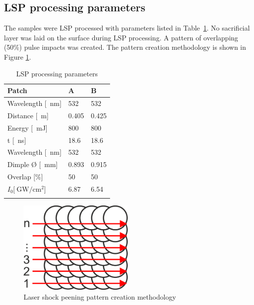 \documentclass[sn-nature]{sn-jnl}%
\theoremstyle{thmstyleone}%
\theoremstyle{thmstyletwo}%
\theoremstyle{thmstylethree}%
\begin{document}

    \subsection{LSP processing parameters}

   The samples were LSP processed with parameters listed in Table~\ref{tab:lspparameters}. No sacrificial layer was laid on the surface during LSP processing. A  pattern of overlapping (50\%) pulse impacts was created. The pattern creation methodology is shown in Figure \ref{fig:pattern_creation}.

    \begin{table}[h!]
    \caption{LSP processing parameters}\label{tab:lspparameters}%
    \begin{tabular}{@{}lll@{}}
    \toprule
    Patch & A & B  \\
    \midrule
    Wavelength [\SI{}{\nm}] & 532 & 532    \\
    Distance [\SI{}{\m}] & 0.405 & 0.425    \\
    Energy [\SI{}{\milli\joule}]& 800 & 800    \\
    t [\SI{}{\ns}] & 18.6 & 18.6    \\
    Wavelength [\SI{}{\nm}] & 532 & 532    \\
    Dimple Ø [\SI{}{ \mm}] & 0.893 & 0.915    \\
    Overlap [\%]  & 50 & 50    \\
    \( I_0  [\SI[]{}{\giga\watt/\cm^2} \)]  & 6.87 & 6.54 \\
    \botrule
    \end{tabular}
    \end{table}



    \begin{figure}[h!]     
    \centering
    \includegraphics[width=0.5\textwidth]{pattern_creation.png}
    \caption{Laser shock peening pattern creation methodology}
    \label{fig:pattern_creation}
    \end{figure}
    
\end{document}
